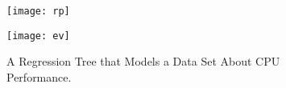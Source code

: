 \documentclass[12pt]{article}
\begin{document}
\begin{figure}[p]
\centering

\vspace*{-.6in}

\begin{center}
\texttt{[image: rp]}
\end{center}

\vspace*{-.75in}

\begin{center}
\texttt{[image: ev]}
\end{center}

\vspace*{-.25in}

\caption{A Regression Tree that Models a Data Set About CPU Performance.}
\label{figure:tree}
\vspace*{-.25in}
\end{figure}
\end{document}
